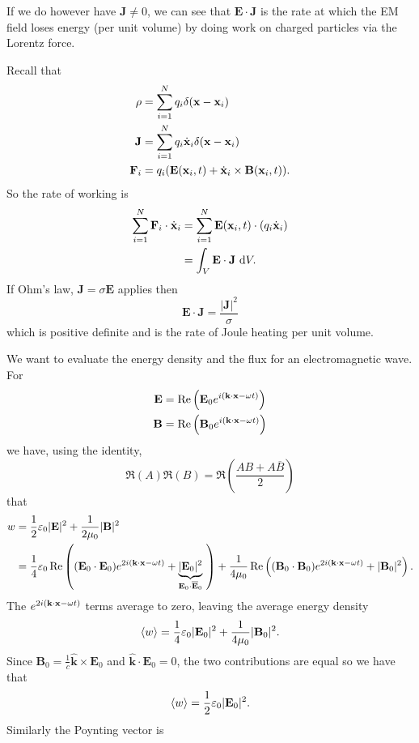 \documentclass{article}
\begin{document}
If we do however have $ \mathbf J \ne 0 $, we can see that $ \mathbf E\cdot\mathbf J $ is the rate at which the EM field loses energy (per unit volume) by doing work on charged particles via the Lorentz force.
\par
Recall that
\begin{align*}
	\rho &= \sum_{i=1}^N q_i \delta (\mathbf{x} -\mathbf{x}_i) \\
	\mathbf J &= \sum_{i=1}^N q_i \dot{\mathbf{x}}_i \delta(\mathbf{x}-\mathbf{x}_i)\\
	\mathbf F_i &= q_i(\mathbf E(\mathbf{x}_i,t)+\dot {\mathbf{x}}_i \times \mathbf B(\mathbf{x}_i,t)).
\end{align*}
So the rate of working is
\begin{align*}
	\sum_{i=1}^N \mathbf F_i\cdot\dot{\mathbf{x}}_i &= \sum_{i=1}^N \mathbf E(\mathbf{x}_i,t)\cdot(q_i\dot{\mathbf{x}}_i) \\
	&= \int_V\mathbf E\cdot\mathbf J \ \mathrm dV.
\end{align*}
If Ohm's law, $ \mathbf J = \sigma \mathbf E $ applies then
\[
	\mathbf E\cdot\mathbf J = \frac{|\mathbf J|^2}\sigma
\]
which is positive definite and is the rate of Joule heating per unit volume.\par
We want to evaluate the energy density and the flux for an electromagnetic wave. For
\begin{align*}
	\mathbf E &= \operatorname{Re}\left(\mathbf E_0 e^{i(\mathbf k\cdot\mathbf{x} - \omega t)}\right) \\
	\mathbf B &= \operatorname{Re}\left(\mathbf B_0 e^{i(\mathbf k\cdot \mathbf{x} - \omega t)}\right)
\end{align*}
we have, using the identity, 
\[
	\Re(A)\Re(B) = \Re\left(\frac{AB+A\overline B}2\right)
\]
that
\begin{align*}
	w &= \frac 12 \varepsilon_0 |\mathbf E|^2+\frac 1{2\mu_0}|\mathbf B|^2\\
	  &= \frac 14 \varepsilon_0 \operatorname{Re}\left((\mathbf E_0\cdot\mathbf E_0)e^{2i(\mathbf k \cdot\mathbf{x} -\omega t)}+\underbrace{|\mathbf E_0|^2}_{\mathbf E_0 \cdot\overline{\mathbf E}_0}\ \right) + \frac 1{4\mu_0}\operatorname{Re}\left((\mathbf B_0\cdot\mathbf B_0)e^{2i(\mathbf k \cdot \mathbf{x} -\omega t)}+|\mathbf B_0|^2\right).
\end{align*}
The $ e^{2i(\mathbf k\cdot\mathbf{x}-\omega t)} $ terms average to zero, leaving the average energy density
\[
	\langle w\rangle = \frac 14 \varepsilon_0 |\mathbf E_0|^2 + \frac 1{4\mu_0}|\mathbf B_0|^2.
\]
Since $ \mathbf B_0 = \frac 1c \hat{\mathbf k}\times \mathbf E_0 $ and $ \hat{\mathbf k}\cdot\mathbf E_0 = 0 $, the two contributions are equal so we have that
\[
  \langle w \rangle = \frac 12 \varepsilon_0 |\mathbf E_0|^2.
\]
Similarly the Poynting vector is
\end{document}

